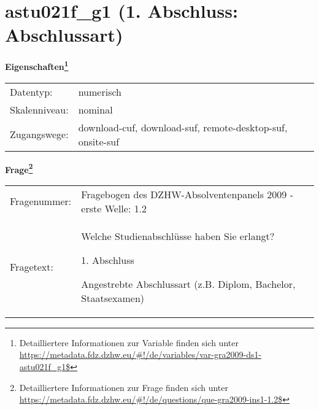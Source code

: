 
    \setcounter{footnote}{0}

    \vspace*{-1.8cm}
	\section{astu021f\_g1 (1. Abschluss: Abschlussart)}
	\label{section:astu021f_g1}



    \vspace*{0.5cm}
    \noindent\textbf{Eigenschaften\footnote{Detailliertere Informationen zur Variable finden sich unter
		\url{https://metadata.fdz.dzhw.eu/\#!/de/variables/var-gra2009-ds1-astu021f_g1$}}}\\
	\begin{tabularx}{\hsize}{@{}lX}
	Datentyp: & numerisch \\
	Skalenniveau: & nominal \\
	Zugangswege: &
	  download-cuf, 
	  download-suf, 
	  remote-desktop-suf, 
	  onsite-suf
 \\
    \end{tabularx}



				\vspace*{0.5cm}
                \noindent\textbf{Frage\footnote{Detailliertere Informationen zur Frage finden sich unter
		              \url{https://metadata.fdz.dzhw.eu/\#!/de/questions/que-gra2009-ins1-1.2$}}}\\
				\begin{tabularx}{\hsize}{@{}lX}
					Fragenummer: &
					  Fragebogen des DZHW-Absolventenpanels 2009 - erste Welle:
					  1.2
 \\
					Fragetext: & Welche Studienabschlüsse haben Sie erlangt?\par  1. Abschluss\par  Angestrebte Abschlussart (z.B. Diplom, Bachelor, Staatsexamen) \\
				\end{tabularx}





